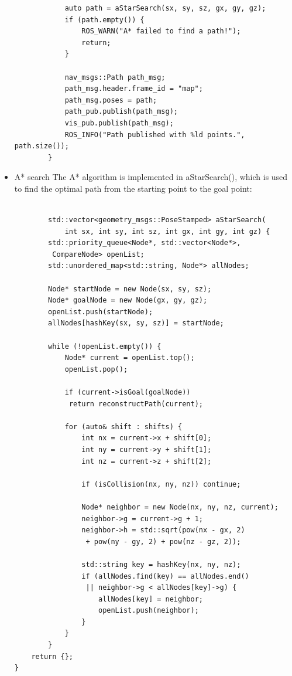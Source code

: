 \documentclass{article}
\begin{document}
\begin{itemize}
\begin{lstlisting}
            auto path = aStarSearch(sx, sy, sz, gx, gy, gz);
            if (path.empty()) {
                ROS_WARN("A* failed to find a path!");
                return;
            }

            nav_msgs::Path path_msg;
            path_msg.header.frame_id = "map";
            path_msg.poses = path;
            path_pub.publish(path_msg);
            vis_pub.publish(path_msg);
            ROS_INFO("Path published with %ld points.", path.size());
        }
\end{lstlisting}

    \item A* search
    The A* algorithm is implemented in aStarSearch(), which is used to find the optimal path from the starting point to the goal point:

    \begin{lstlisting}

        std::vector<geometry_msgs::PoseStamped> aStarSearch(
            int sx, int sy, int sz, int gx, int gy, int gz) {
        std::priority_queue<Node*, std::vector<Node*>,
         CompareNode> openList;
        std::unordered_map<std::string, Node*> allNodes;

        Node* startNode = new Node(sx, sy, sz);
        Node* goalNode = new Node(gx, gy, gz);
        openList.push(startNode);
        allNodes[hashKey(sx, sy, sz)] = startNode;

        while (!openList.empty()) {
            Node* current = openList.top();
            openList.pop();

            if (current->isGoal(goalNode))
             return reconstructPath(current);

            for (auto& shift : shifts) {
                int nx = current->x + shift[0];
                int ny = current->y + shift[1];
                int nz = current->z + shift[2];

                if (isCollision(nx, ny, nz)) continue;

                Node* neighbor = new Node(nx, ny, nz, current);
                neighbor->g = current->g + 1;
                neighbor->h = std::sqrt(pow(nx - gx, 2)
                 + pow(ny - gy, 2) + pow(nz - gz, 2));

                std::string key = hashKey(nx, ny, nz);
                if (allNodes.find(key) == allNodes.end()
                 || neighbor->g < allNodes[key]->g) {
                    allNodes[key] = neighbor;
                    openList.push(neighbor);
                }
            }
        }
    return {};
}


\end{lstlisting}
\end{itemize}
\end{document}
